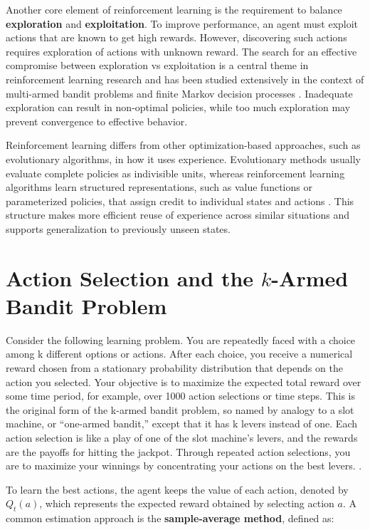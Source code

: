 Another core element of reinforcement learning is the requirement to balance \textbf{exploration} and \textbf{exploitation}. To improve performance, an agent must exploit actions that are known to get high rewards. However, discovering such actions requires exploration of actions with unknown reward. The search for an effective compromise between exploration vs exploitation is a central theme in reinforcement learning research and has been studied extensively in the context of multi-armed bandit problems and finite Markov decision processes \cite{burnetas1997}. Inadequate exploration can result in non-optimal policies, while too much exploration may prevent convergence to effective behavior.

Reinforcement learning differs from other optimization-based approaches, such as evolutionary algorithms, in how it uses experience. Evolutionary methods usually evaluate complete policies as indivisible units, whereas reinforcement learning algorithms learn structured representations, such as value functions or parameterized policies, that assign credit to individual states and actions \cite{sutton}. This structure makes more efficient reuse of experience across similar situations and supports generalization to previously unseen states.


\section{Action Selection and the \texorpdfstring{$k$}{k}-Armed Bandit Problem}


Consider the following learning problem. You are repeatedly faced with a choice among k different options or actions. After each choice, you receive a numerical reward chosen from a stationary probability distribution that depends on the action you selected. Your objective is to maximize the expected total reward over some time period, for example, over 1000 action selections or time steps. This is the original form of the k-armed bandit problem, so named by analogy to a slot machine, or “one-armed bandit,” except that it has k levers instead of one. Each action selection is like a play of one of the slot machine’s levers, and the rewards are the payoffs for hitting the jackpot. Through repeated action selections, you are to maximize your winnings by concentrating your actions on the best levers. \cite{sutton}.


To learn the best actions, the agent keeps the value of each action, denoted by $Q_t(a)$, which represents the expected reward obtained by selecting action $a$. A common estimation approach is the \textbf{sample-average method}, defined as:


